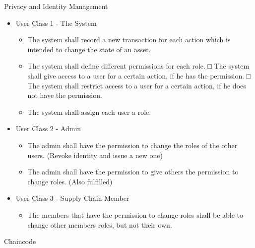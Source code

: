 	Privacy and Identity Management
    \begin{itemize}
        \item User Class 1 - The System
        \begin{itemize}
			\item The system shall record a new transaction for each action which is intended to change the state of an asset.
			\item The system shall define different permissions for each role.
				□ The system shall give access to a user for a certain action, if he has the permission.
				□ The system shall restrict access to a user for a certain action, if he does not have the permission.
			\item The system shall assign each user a role.
		\end{itemize}
        \item User Class 2 - Admin
    \begin{itemize}
			\item The admin shall have the permission to change the roles of the other users.
				(Revoke identity and issue a new one)
			\item The admin shall have the permission to give others the permission to change roles.
				 (Also fulfilled)
		\end{itemize}
        \item User Class 3 - Supply Chain Member
        \begin{itemize}
            \item The members that have the permission to change roles shall be able to change other members roles, but not their own.
        \end{itemize}
    \end{itemize}
	Chaincode
